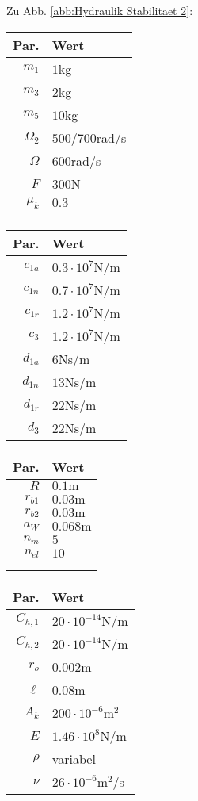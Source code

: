 Zu Abb. \ref{abb:Hydraulik Stabilitaet 2}:
\begin{center}
\begin{tabular}{r|l}
Par. &Wert\\\hline
$m_1$&$1$kg\\
$m_3$& $2$kg\\
$m_5$&$10$kg\\
$\Omega_2$&$500$/$700$rad/s\\
$\Omega$&$600$rad/s\\
$F$&$300$N\\
$\mu_k$& $0.3$\\
&\\
\end{tabular} \hfill
\begin{tabular}{r|l}
Par. &Wert\\\hline
$c_{1a}$&$0.3\cdot10^{7}$N/m\\
$c_{1n}$&$0.7\cdot10^{7}$N/m \\
$c_{1r}$ & $1.2\cdot10^{7}$N/m\\
$c_{3}$& $1.2\cdot10^{7}$N/m\\
$d_{1a}$&$6$Ns/m\\
$d_{1n}$&$13$Ns/m \\
$d_{1r}$ &$22$Ns/m\\
$d_{3}$ & $22$Ns/m\\
\end{tabular}\hfill
\begin{tabular}{r|l}
Par. &Wert\\\hline
$R$&$0.1\textrm{m}$ \\
$r_{b1}$&$0.03\textrm{m}$\\
$r_{b2}$&$0.03\textrm{m}$\\
$a_{W}$&$ 0.068\textrm{m}$\\
$n_m$&$5$\\
$n_{el}$&$10$\\
&\\
&
\end{tabular} \hfill
\begin{tabular}{r|l}
Par. &Wert\\\hline
$C_{h,1}$&$20\cdot10^{-14}$N/m\\
$C_{h,2}$&$20\cdot10^{-14}$N/m\\
$r_o$&$0.002$m\\
$\ell$&$0.08$m\\
$A_k$&$200\cdot10^{-6}$m$^2$\\
$E$&$1.46\cdot10^{8}$N/m\\
$\rho$&variabel\\
$\nu$&$26\cdot10^{-6}$m$^2$/s\\
\end{tabular}
\end{center}

